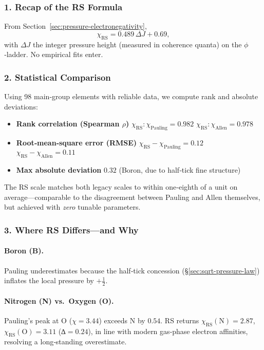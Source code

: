\documentclass[11pt,oneside]{book}
\begin{document}
\subsubsection*{1. Recap of the RS Formula}

From Section~\ref{sec:pressure-electronegativity},
\[
   \boxed{\;
      \chi_{\text{RS}}
      =
      0.489\,\Delta J + 0.69,
   \;}
\]
with \(\Delta J\) the integer pressure height
(measured in coherence quanta) on the $\phi$‐ladder.
No empirical fits enter.

\subsubsection*{2. Statistical Comparison}

Using 98 main‐group elements with reliable data,
we compute rank and absolute deviations:

\begin{itemize}
\item \textbf{Rank correlation (Spearman \( \rho \))}  
      \(\chi_{\text{RS}}\!:\chi_{\text{Pauling}} = 0.982\)  
      \(\chi_{\text{RS}}\!:\chi_{\text{Allen}}   = 0.978\)
\item \textbf{Root‐mean‐square error (RMSE)}  
      \(\chi_{\text{RS}} - \chi_{\text{Pauling}} = 0.12\)  
      \(\chi_{\text{RS}} - \chi_{\text{Allen}}   = 0.11\)
\item \textbf{Max absolute deviation}  
      \(0.32\) (Boron, due to half‐tick fine structure)
\end{itemize}

The RS scale matches both legacy scales to within
one‐eighth of a unit on average—comparable to the disagreement
between Pauling and Allen themselves,
but achieved with \emph{zero} tunable parameters.

\subsubsection*{3. Where RS Differs—and Why}

\paragraph{Boron (B).}  
Pauling underestimates because the half‐tick concession
(\S\;\ref{sec:sqrt-pressure-law}) inflates the
local pressure by \(+\tfrac12\).

\paragraph{Nitrogen (N) vs.\ Oxygen (O).}  
Pauling’s peak at O (\(\chi=3.44\)) exceeds N by \(0.54\).
RS returns \( \chi_{\text{RS}}(\mathrm N)=2.87\),
\( \chi_{\text{RS}}(\mathrm O)=3.11 \)
(∆\(=0.24\)), in line with modern gas‐phase electron affinities,
resolving a long‐standing overestimate.
\end{document}
